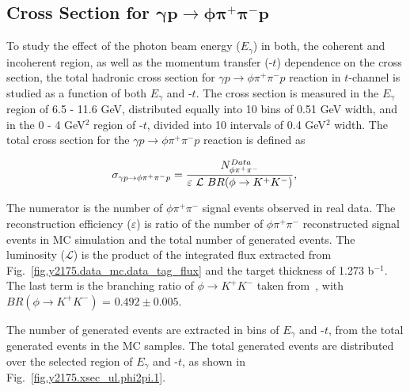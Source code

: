 \subsection{Cross Section for \texorpdfstring{$\bm{\gamma p \rightarrow \phi \pi^{+} \pi^{-} p}$}{} }
\label{chap.y2175.xsec_ul.phi2pi}

To study the effect of the photon beam energy ($E_{\gamma}$) in both, the coherent and incoherent region, as well as the momentum transfer (-$t$) dependence on the cross section, the total hadronic cross section for $\gamma p \rightarrow \phi \pi^{+} \pi^{-} p$ reaction in $t$-channel is studied as a function of both $E_{\gamma}$ and -$t$. The cross section is measured in the $E_{\gamma}$ region of 6.5 - 11.6 GeV, distributed equally into 10 bins of 0.51 GeV width, and in the 0 - 4 GeV$^2$ region of -$t$, divided into 10 intervals of 0.4 GeV$^2$ width. The total cross section for the $\gamma p \rightarrow \phi \pi^{+} \pi^{-} p$ reaction is defined as

\begin{equation}
    \label{eq.y2175.xsec_ul.phi2pi}
    \sigma_{\gamma p \rightarrow \phi \pi^{+} \pi^{-} p} = \frac{N_{\phi\pi^+\pi^-}^{Data}}{\varepsilon~\mathcal{L}~BR(\phi\rightarrow K^{+}K^{-})},\\
\end{equation}

\noindent The numerator is the number of $\phi\pi^+\pi^-$ signal events observed in real data. The reconstruction efficiency ($\varepsilon$) is ratio of the number of $\phi\pi^+\pi^-$ reconstructed signal events in MC simulation and the total number of generated events. The luminosity ($\mathcal{L}$) is the product of the integrated flux extracted from Fig.~\ref{fig.y2175.data_mc.data_tag_flux} and the target thickness of 1.273 b$^{-1}$. The last term is the branching ratio of $\phi\rightarrow K^{+}K^{-}$ taken from~\cite{Tanabashi18}, with $BR(\phi\rightarrow K^{+}K^{-})$ = $0.492 \pm 0.005$.
\par The number of generated events are extracted in bins of $E_{\gamma}$ and -$t$, from the total generated events in the MC samples. The total generated events are distributed over the selected region of $E_{\gamma}$ and -$t$, as shown in Fig.~\ref{fig.y2175.xsec_ul.phi2pi.1}.


